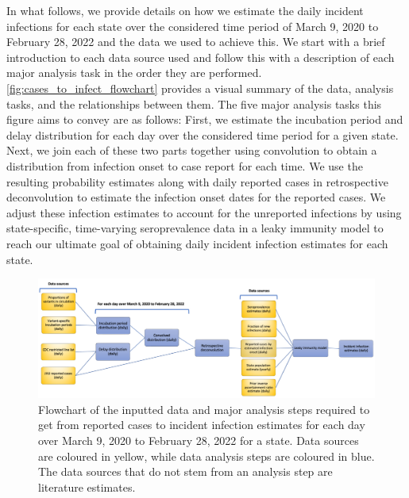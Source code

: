 \documentclass{article}
\begin{document}
In what follows, we provide details on how we estimate the daily incident
infections for each state over the considered time period of March 9, 2020 to
February 28, 2022 and the data we used to achieve this. We start with a brief
introduction to each data source used and follow this with a description of each
major analysis task in the order they are performed.
\autoref{fig:cases_to_infect_flowchart} provides a visual summary of the data,
analysis tasks, and the relationships between them. The five major analysis
tasks this figure aims to convey are as follows: First, we estimate the
incubation period and delay distribution for each day over the considered time
period for a given state. Next, we join each of these two parts together using
convolution to obtain a distribution from infection onset to case report for
each time. We use the resulting probability estimates along with daily reported
cases in retrospective deconvolution to estimate the infection onset dates for
the reported cases. We adjust these infection estimates to account for the
unreported infections by using state-specific, time-varying seroprevalence data
in a leaky immunity model to reach our ultimate goal of obtaining daily incident
infection estimates for each state. 


\begin{figure}[!tb]
\centering
    \includegraphics[width=.99\textwidth]{Reported_cases_to_infect_flowchart.pdf} 
    \caption{Flowchart of the inputted data and major analysis steps required 
    to get from reported cases to incident infection estimates for each day 
    over March 9, 2020 to February 28, 2022 for a state. Data sources are coloured 
    in yellow, while data analysis steps are coloured in blue. The data sources that
    do not stem from an analysis step are literature estimates.}
    \label{fig:cases_to_infect_flowchart}
\end{figure}
\end{document}
